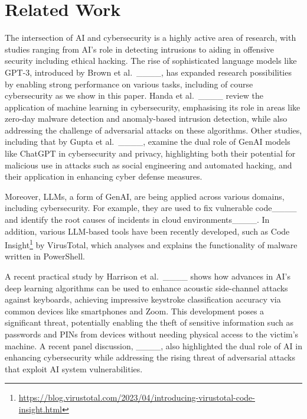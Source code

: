\section{Related Work}
\label{Related work}

The intersection of AI and cybersecurity is a highly active area of research, with studies ranging
from AI's role in detecting intrusions to aiding in offensive security including ethical hacking. The rise of sophisticated language models like GPT-3, introduced by Brown et al.\ ____, has expanded research possibilities by enabling strong performance on various tasks, including of course cybersecurity as we show in this paper.  %
Handa et al.\ ____ review the application of machine learning in cybersecurity, emphasising its role in areas like zero-day malware detection and anomaly-based intrusion detection, while also addressing the challenge of adversarial attacks on these algorithms.  
Other  studies, including that by Gupta et al.\ ____, examine the dual role of GenAI models like ChatGPT in cybersecurity and privacy, highlighting both their potential for malicious use in attacks such as social engineering and automated hacking, and their application in enhancing cyber defense  measures.

Moreover,  LLMs, a form of GenAI, are being applied across various domains, including cybersecurity. For example, they are used to fix vulnerable code____ and identify the root causes of incidents in cloud environments____.  In addition, various LLM-based tools have been recently developed, such as Code Insight\footnote{\url{https://blog.virustotal.com/2023/04/introducing-virustotal-code-insight.html}} by VirusTotal, which analyses and explains the functionality of malware written in PowerShell. %

 

 A recent practical study by Harrison et
al.\ ____ shows how advances in AI's deep learning algorithms can
be used to enhance acoustic side-channel attacks against keyboards, achieving impressive keystroke
classification accuracy via common devices like smartphones and Zoom. This development poses a
significant threat, potentially enabling the theft of sensitive information such as passwords and
PINs from devices without needing physical access to the victim's machine. A recent panel
discussion, ____, also highlighted the dual role of AI in enhancing cybersecurity
while addressing the rising threat of adversarial attacks that exploit AI system vulnerabilities.

